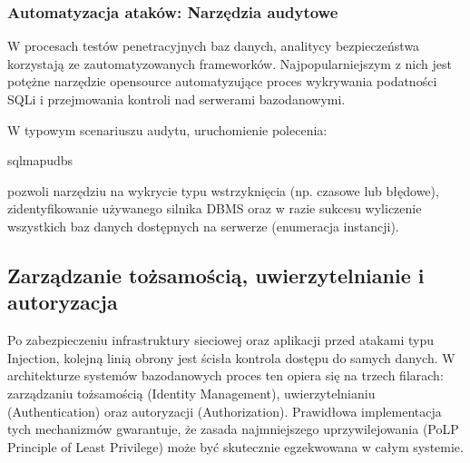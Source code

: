 \documentclass[a4paper,11pt,english,openany,oneside]{sphinxmanual}
\begin{document}
\subsubsection{Automatyzacja ataków: Narzędzia audytowe}
\label{\detokenize{rozdzial_2/rozdzial_27/rozdzial_2:automatyzacja-atakow-narzedzia-audytowe}}
\sphinxAtStartPar
W procesach testów penetracyjnych baz danych, analitycy bezpieczeństwa korzystają ze zautomatyzowanych frameworków. Najpopularniejszym z nich jest  \textendash{} potężne narzędzie open\sphinxhyphen{}source automatyzujące proces wykrywania podatności SQLi i przejmowania kontroli nad serwerami bazodanowymi.

\sphinxAtStartPar
W typowym scenariuszu audytu, uruchomienie polecenia:

\begin{sphinxVerbatim}[commandchars=\\\{\}]
sqlmap\PYGZhy{}u\PYGZhy{}\PYGZhy{}dbs
\end{sphinxVerbatim}

\sphinxAtStartPar
pozwoli narzędziu na wykrycie typu wstrzyknięcia (np. czasowe lub błędowe), zidentyfikowanie używanego silnika DBMS oraz \textendash{} w razie sukcesu \textendash{} wyliczenie wszystkich baz danych dostępnych na serwerze (enumeracja instancji).

\sphinxstepscope


\subsection{Zarządzanie tożsamością, uwierzytelnianie i autoryzacja}
\label{\detokenize{rozdzial_2/rozdzial_27/rozdzial_3:zarzadzanie-tozsamoscia-uwierzytelnianie-i-autoryzacja}}\label{\detokenize{rozdzial_2/rozdzial_27/rozdzial_3::doc}}
\sphinxAtStartPar
Po zabezpieczeniu infrastruktury sieciowej oraz aplikacji przed atakami typu Injection, kolejną linią obrony jest ścisła kontrola dostępu do samych danych. W architekturze systemów bazodanowych proces ten opiera się na trzech filarach: zarządzaniu tożsamością (Identity Management), uwierzytelnianiu (Authentication) oraz autoryzacji (Authorization). Prawidłowa implementacja tych mechanizmów gwarantuje, że zasada najmniejszego uprzywilejowania (PoLP \sphinxhyphen{} Principle of Least Privilege) może być skutecznie egzekwowana w całym systemie.
\end{document}
